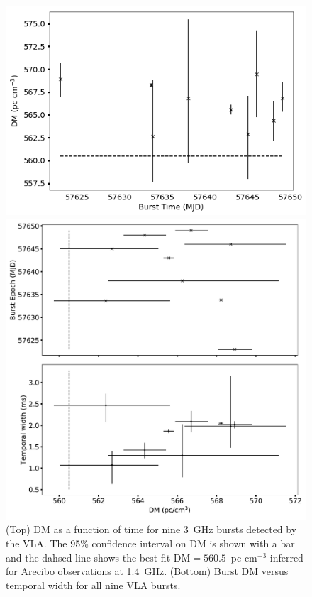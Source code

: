 \documentclass[twocolumn]{aastex61}
\begin{document}
\begin{figure}[htb]
\begin{center}
\includegraphics[width=0.9\columnwidth]{dmmodel}

\includegraphics[width=0.9\columnwidth]{burst_dmdt}

\caption{(Top) DM as a function of time for nine 3~GHz bursts detected by the VLA. The 95\% confidence interval on DM is shown with a bar and the dahsed line shows the best-fit DM$=560.5$\ pc cm$^{-3}$ inferred for Arecibo observations at 1.4~GHz. (Bottom) Burst DM versus temporal width for all nine VLA bursts.
\label{fig:dmmodel}}
\end{center}
\end{figure}
\end{document}
